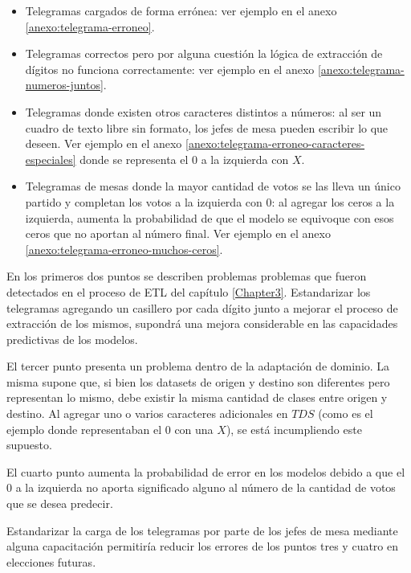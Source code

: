 \begin{itemize}
    \item Telegramas cargados de forma err\'onea: ver ejemplo en el anexo \ref{anexo:telegrama-erroneo}.
    \item Telegramas correctos pero por alguna cuesti\'on la l\'ogica de extracci\'on de d\'igitos no funciona correctamente: ver
          ejemplo en el anexo \ref{anexo:telegrama-numeros-juntos}.
    \item Telegramas donde existen otros caracteres distintos a n\'umeros: al ser un cuadro de texto libre sin formato, los jefes
          de mesa pueden escribir lo que deseen. Ver ejemplo en el anexo \ref{anexo:telegrama-erroneo-caracteres-especiales}
          donde se representa el $0$ a la izquierda con $X$.
    \item Telegramas de mesas donde la mayor cantidad de votos se las lleva un \'unico partido y completan los votos a la
          izquierda con $0$: al agregar los ceros a la izquierda, aumenta la probabilidad de que el modelo se equivoque con esos
          ceros que no aportan al n\'umero final. Ver ejemplo en el anexo \ref{anexo:telegrama-erroneo-muchos-ceros}.
\end{itemize}

En los primeros dos puntos se describen problemas problemas que fueron detectados en el proceso de ETL del cap\'itulo
\ref{Chapter3}. Estandarizar los telegramas agregando un casillero por cada d\'igito junto a mejorar el proceso de
extracci\'on de los mismos, supondr\'a una mejora considerable en las capacidades predictivas de los modelos.

El tercer punto presenta un problema dentro de la adaptaci\'on de dominio. La misma supone que, si bien los datasets de
origen y destino son diferentes pero representan lo mismo, debe existir la misma cantidad de clases entre origen y
destino. Al agregar uno o varios caracteres adicionales en $TDS$ (como es el ejemplo donde representaban el $0$ con una
$X$), se est\'a incumpliendo este supuesto.

El cuarto punto aumenta la probabilidad de error en los modelos debido a que el $0$ a la izquierda no aporta
significado alguno al n\'umero de la cantidad de votos que se desea predecir.

Estandarizar la carga de los telegramas por parte de los jefes de mesa mediante alguna capacitaci\'on permitir\'ia
reducir los errores de los puntos tres y cuatro en elecciones futuras.

